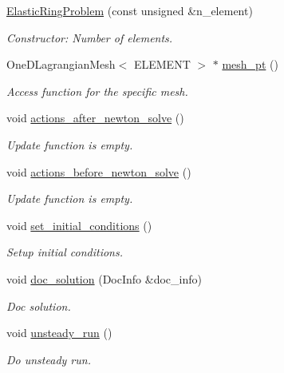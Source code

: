 \begin{DoxyCompactItemize}
\hyperlink{classElasticRingProblem_a35ea54990c8b848aebcbb635b8c5be8e}{Elastic\+Ring\+Problem} (const unsigned \&n\+\_\+element)
\begin{DoxyCompactList}\small\item\em Constructor\+: Number of elements. \end{DoxyCompactList}\item 
One\+D\+Lagrangian\+Mesh$<$ E\+L\+E\+M\+E\+NT $>$ $\ast$ \hyperlink{classElasticRingProblem_a763200d4985bca4a120f2be2a217f4a8}{mesh\+\_\+pt} ()
\begin{DoxyCompactList}\small\item\em Access function for the specific mesh. \end{DoxyCompactList}\item 
void \hyperlink{classElasticRingProblem_ab0eb0dcecfa7e9c9e52ecf319f6e873e}{actions\+\_\+after\+\_\+newton\+\_\+solve} ()
\begin{DoxyCompactList}\small\item\em Update function is empty. \end{DoxyCompactList}\item 
void \hyperlink{classElasticRingProblem_aac5f3adac1e1a42492bd428eeb732a3d}{actions\+\_\+before\+\_\+newton\+\_\+solve} ()
\begin{DoxyCompactList}\small\item\em Update function is empty. \end{DoxyCompactList}\item 
void \hyperlink{classElasticRingProblem_ab435f36b59e5f76301123c3440363704}{set\+\_\+initial\+\_\+conditions} ()
\begin{DoxyCompactList}\small\item\em Setup initial conditions. \end{DoxyCompactList}\item 
void \hyperlink{classElasticRingProblem_a9aa904e4cf82d45711f890cd8440ced9}{doc\+\_\+solution} (Doc\+Info \&doc\+\_\+info)
\begin{DoxyCompactList}\small\item\em Doc solution. \end{DoxyCompactList}\item 
void \hyperlink{classElasticRingProblem_acd30c4363ffedbaadc1523aa8b85523b}{unsteady\+\_\+run} ()
\begin{DoxyCompactList}\small\item\em Do unsteady run. \end{DoxyCompactList}\item 

\end{DoxyCompactItemize}
